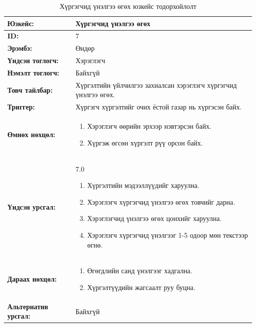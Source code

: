 \begin{table}[H]
    \caption{Хүргэгчид үнэлгээ өгөх юзкейс тодорхойлолт}
    \begin{tabular}{|l|p{9cm}|}
		\hline
		{\bfseries Юзкейс:} & Хүргэгчид үнэлгээ өгөх \\\hline
		{\bfseries ID:} & 7 \\\hline
		{\bfseries Эрэмбэ:} & Өндөр \\\hline
		{\bfseries Үндсэн тоглогч:} & Хэрэглэгч \\\hline
		{\bfseries Нэмэлт тоглогч:} & Байхгүй \\\hline
		{\bfseries Товч тайлбар:} & Хүргэлтийн үйлчилгээ захиалсан хэрэглэгч хүргэгчид үнэлгээ өгөх.\\\hline
		{\bfseries Триггер:} & Хүргэгч хүргэлтийг очих ёстой газар нь хүргэсэн байх. \\\hline
		{\bfseries Өмнөх нөхцөл:} &
		    \begin{enumerate}[nosep]
		        \item Хэрэглэгч өөрийн эрхээр нэвтэрсэн байх.
		        \item Хүргэж өгсөн хүргэлт рүү орсон байх.
		    \end{enumerate}
		\\\hline
		{\bfseries Үндсэн урсгал:} &
			7.0
			\begin{enumerate}[nosep]
			    \item Хүргэлтийн мэдээллүүдийг харуулна.
			    \item Хэрэглэгч хүргэгчид үнэлгээ өгөх товчийг дарна.
			    \item Хэрэглэгчид үнэлгээ өгөх цонхийг харуулна.
			    \item Хэрэглэгч хүргэгчид үнэлгээг 1-5 одоор мөн текстээр өгнө.
			\end{enumerate}
		\\\hline
		{\bfseries Дараах нөхцөл:} &
		    \begin{enumerate}[nosep]
		        \item Өгөгдлийн санд үнэлгээг хадгална.
		        \item Хүргэлтүүдийн жагсаалт руу буцна.
		    \end{enumerate}
		\\\hline
		{\bfseries Альтернатив урсгал:} & Байхгүй
		\\\hline
    \end{tabular}
\end{table}

